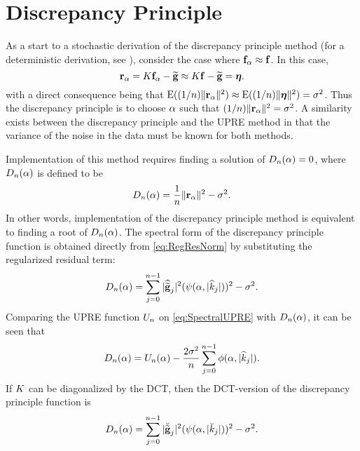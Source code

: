 \section{Discrepancy Principle} \label{sec:Discrepancy Principle}
As a start to a stochastic derivation of the discrepancy principle method \cite{Morozov1966} (for a deterministic derivation, see \cite[p.~8-9]{Vogel:2002}), consider the case where $\mathbf{f}_{\alpha} \approx \mathbf{f}$. In this case,
\[\mathbf{r}_{\alpha} = K\mathbf{f}_{\alpha} - \widetilde{\mathbf{g}} \approx K\mathbf{f} - \widetilde{\mathbf{g}} = \boldsymbol{\eta}.\]
with a direct consequence being that $\operatorname{E}((1/n)\|\mathbf{r}_{\alpha}\|^2) \approx \operatorname{E}((1/n)\|\boldsymbol{\eta}\|^2) =\sigma^2$. Thus the discrepancy principle is to choose $\alpha$ such that $(1/n)\|\mathbf{r}_{\alpha}\|^2 = \sigma^2$. A similarity exists between the discrepancy principle and the UPRE method in that the variance of the noise in the data must be known for both methods. \par 
Implementation of this method requires finding a solution of $D_n(\alpha) = 0$, where $D_n(\alpha)$ is defined to be
\begin{equation}
\label{eq:DP}
D_n(\alpha) = \frac{1}{n}\|\mathbf{r}_{\alpha}\|^2 - \sigma^2.
\end{equation}
In other words, implementation of the discrepancy principle method is equivalent to finding a root of $D_n(\alpha)$. The spectral form of the discrepancy principle function is obtained directly from \eqref{eq:RegResNorm} by substituting the regularized residual term:
\begin{equation}
D_n(\alpha) = \sum_{j = 0}^{n-1} |\widehat{\widetilde{\mathbf{g}}}_j|^2(\psi(\alpha,|\widehat{k}_j|))^2 - \sigma^2.
\label{eq:SpectralDP}
\end{equation}
Comparing the UPRE function $U_n$ on \eqref{eq:SpectralUPRE} with $D_n(\alpha)$, it can be seen that
\begin{equation}
\label{eq:UPRE DP Comp}
D_n(\alpha) = U_n(\alpha) - \frac{2\sigma^2}{n}\sum_{j = 0}^{n-1} \phi(\alpha,|\widehat{k}_j|).
\end{equation}
If $K$ can be diagonalized by the DCT, then the DCT-version of the discrepancy principle function is
\begin{equation}
D_n(\alpha) = \sum_{j = 0}^{n-1} |\breve{\widetilde{\mathbf{g}}}_j|^2(\psi(\alpha,|\breve{k}_j|))^2 - \sigma^2.
\label{eq:DP DCT}
\end{equation}


